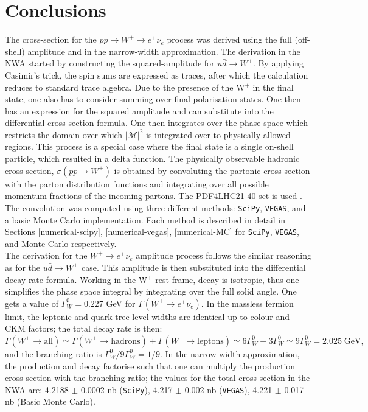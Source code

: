 \documentclass[a4paper,11pt]{article}
\begin{document}
\section{Conclusions}
The cross-section for the $pp \rightarrow W^+ \rightarrow e^+ \nu_e$ process was derived using the full (off-shell) amplitude and in the narrow-width approximation. The derivation in the NWA started by constructing the squared-amplitude for $u\bar{d} \rightarrow W^+$. By applying Casimir’s trick, the spin sums are expressed as traces, after which the calculation reduces to standard trace algebra. Due to the presence of the W$^+$ in the final state, one also has to consider summing over final polarisation states. One then has an expression for the squared amplitude and can substitute into the differential cross-section formula. One then integrates over the phase-space which restricts the domain over which $|\mathcal{M}|^2$ is integrated over to physically allowed regions. This process is a special case where the final state is a single on-shell particle, which resulted in a delta function. The physically observable hadronic cross-section, $\sigma(pp \rightarrow W^+)$ is obtained by convoluting the partonic cross-section with the parton distribution functions and integrating over all possible momentum fractions of the incoming partons. The PDF4LHC21$\_$40 set is used \cite{PDF4LHCWorkingGroup:2022cjn}. The convolution was computed using three different methods: \texttt{SciPy}, \texttt{VEGAS}, and a basic Monte Carlo implementation. Each method is described in detail in Sections \ref{numerical-scipy}, \ref{numerical-vegas}, \ref{numerical-MC} for \texttt{SciPy}, \texttt{VEGAS}, and Monte Carlo respectively.\\

The derivation for the $W^+ \rightarrow e^+ \nu_e$ amplitude process follows the similar reasoning as for the $u\bar{d}\rightarrow W^+$ case. This amplitude is then substituted into the differential decay rate formula. Working in the W$^+$ rest frame, decay is isotropic, thus one simplifies the phase space integral by integrating over the full solid angle. One gets a value of $\Gamma^0_W= 0.227$ GeV for $\Gamma (W^+ \rightarrow e^+ \nu_e)$. In the massless fermion limit, the leptonic and quark tree-level widths are identical up to colour and CKM factors; the total decay rate is then: 
$
\Gamma(W^+ \rightarrow \text{all}) \simeq \Gamma(W^+ \rightarrow \text{hadrons}) + \Gamma(W^+ \rightarrow \text{leptons}) \simeq 6\Gamma^0_W + 3\Gamma^0_W \simeq 9\Gamma^0_W = 2.025\; \text{GeV},
$ 
and the branching ratio is $\Gamma^0_W/9\Gamma^0_W = 1/9.$  In the narrow-width approximation, the production and decay factorise such that one can multiply the production cross-section with the branching ratio; the values for the total cross-section in the NWA are:  4.2188 $\pm$ 0.0002 nb (\texttt{SciPy}), 4.217 $\pm$ 0.002 nb (\texttt{VEGAS}), 4.221 $\pm$ 0.017 nb (Basic Monte Carlo).\\
\end{document}
